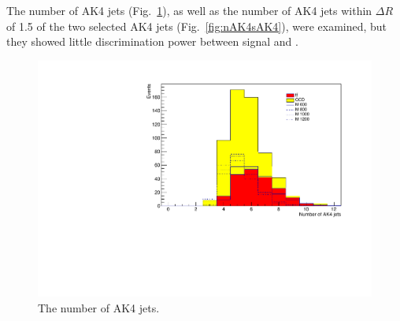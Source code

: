 The number of AK4 jets (Fig.~\ref{fig:nAK4}), as well as the number of AK4 jets within $\Delta R$ of 1.5 of the two selected AK4 jets (Fig.~\ref{fig:nAK4sAK4}), were examined, but they showed little discrimination power between signal and \ttbar. 

\begin{figure}[thb!]
\begin{center}
\includegraphics[scale=0.5]{Figures/extraplSRnumAK4.pdf}
\end{center}
\caption{The number of AK4 jets.}
\label{fig:nAK4}
\end{figure} 

